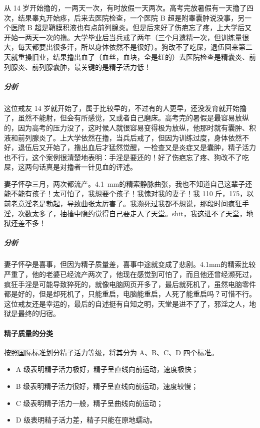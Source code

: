 \begin{case}[不孕不育]
    从 14 岁开始撸的，一两天一次，有时放假一天两次。高考完放暑假有一天撸了四次，结果睾丸开始疼，后来去医院检查，一个医院 B 超是附睾囊肿说没事，另一个医院 B 超是鞘膜积液也有点前列腺炎。但是后来好了伤疤忘了疼，上大学后又开始一两天一次的撸。大学毕业后当兵戒了两年（三个月遗精一次，但训练量很大，每天都要出很多汗，所以身体依然不是很好）。狗改不了吃屎，退伍回来第二天就重操旧业，结果撸出血了（血丝，血块，全是红的）去医院检查是精囊炎、前列腺炎、前列腺囊肿，最关键的是精子活力低！
    \subparagraph{分析} 这位戒友 14 岁就开始了，属于比较早的，不过有的人更早，还没发育就开始撸了，虽然不能射，但会有所感觉，又或者自己磨床。高考完的暑假是最容易放纵的，因为高考的压力没了，这时候人就很容易变得极为放纵，他那时就有囊肿、积液和前列腺炎了。上大学依然在撸，当兵后戒了，但因为训练过度，身体依然不好，退伍后又开始了，撸出血后才猛然觉醒，一检查又是炎症又是囊肿，精子活力也不行，这个案例很清楚地表明：手淫是要还的！好了伤疤忘了疼、狗改不了吃屎，这两句话真是对撸者一针见血的评述。
\end{case}

\begin{case}[不孕不育]
    妻子怀孕三月，两次都流产。\SI{4.1}{\milli\metre}的精索静脉曲张，我也不知道自己这辈子还能不能有孩子！太可怕了，我想要个孩子！我愧对我的妻子！我 110 斤，175，以前老意淫老是勃起，导致曲张太厉害了。我濒死过我都不想说，那段时间疯狂手淫，次数太多了，抽搐中隐约觉得自己要走入了天堂。shit，我这进不了天堂，地狱还差不多！
    \subparagraph{分析} 妻子怀孕是喜事，但因为精子质量差，喜事中途就变成了悲剧。4.1mm的精索比较严重了，他的老婆已经流产两次了，他现在感觉到可怕了，而且他还曾经濒死过，疯狂手淫是可能导致猝死的，就像电脑网页开多了，最后就死机了，虽然电脑零件都是好的，但是却死机了，只能重启，电脑能重启，人死了能重启吗？可惜不行。这位戒友还是幸运的，最后的自述挺有自知之明，天堂是进不了了，邪淫之人，地狱是最终的归宿。
\end{case}

\paragraph{精子质量的分类}

按照国际标准划分精子活力等级，将其分为 A、B、C、D 四个标准。

\begin{itemize}
    \item A 级表明精子活力极好，精子呈直线向前运动，速度极快；
    \item B 级表明精子活力很好，精子呈直线向前运动，速度较慢；
    \item C 级表明精子活力一般，精子呈曲线向前运动；
    \item D 级表明精子活力差，精子只能在原地蠕动。
\end{itemize}

